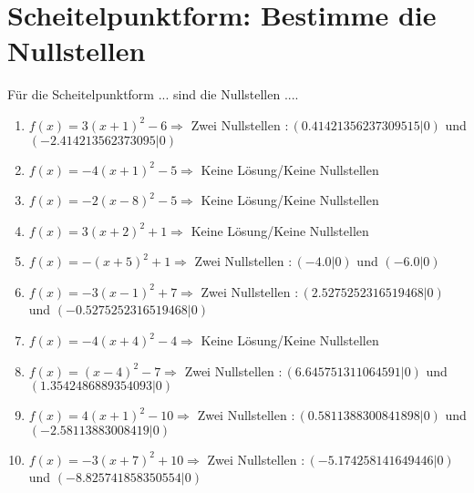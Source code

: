 \documentclass{article}%
\begin{document}
\section{Scheitelpunktform: Bestimme die Nullstellen}%
\label{sec:ScheitelpunktformBestimmedieNullstellen}%
Für die Scheitelpunktform ... sind die Nullstellen ....%
\begin{enumerate}[label=\alph*)]%
\item%
\newline\vspace{0.5cm}$f(x)=3(x+1)^2 -6 \Rightarrow $ Zwei Nullstellen $: (0.41421356237309515|0) $ und $ (-2.414213562373095|0) $%
\item%
\newline\vspace{0.5cm}$f(x)=-4(x+1)^2 -5 \Rightarrow  $ Keine Lösung/Keine Nullstellen $ $%
\item%
\newline\vspace{0.5cm}$f(x)=-2(x-8)^2 -5 \Rightarrow  $ Keine Lösung/Keine Nullstellen $ $%
\item%
\newline\vspace{0.5cm}$f(x)=3(x+2)^2 +1 \Rightarrow  $ Keine Lösung/Keine Nullstellen $ $%
\item%
\newline\vspace{0.5cm}$f(x)=-(x+5)^2 +1 \Rightarrow $ Zwei Nullstellen $: (-4.0|0) $ und $ (-6.0|0) $%
\item%
\newline\vspace{0.5cm}$f(x)=-3(x-1)^2 +7 \Rightarrow $ Zwei Nullstellen $: (2.5275252316519468|0) $ und $ (-0.5275252316519468|0) $%
\item%
\newline\vspace{0.5cm}$f(x)=-4(x+4)^2 -4 \Rightarrow  $ Keine Lösung/Keine Nullstellen $ $%
\item%
\newline\vspace{0.5cm}$f(x)=(x-4)^2 -7 \Rightarrow $ Zwei Nullstellen $: (6.645751311064591|0) $ und $ (1.3542486889354093|0) $%
\item%
\newline\vspace{0.5cm}$f(x)=4(x+1)^2 -10 \Rightarrow $ Zwei Nullstellen $: (0.5811388300841898|0) $ und $ (-2.58113883008419|0) $%
\item%
\newline\vspace{0.5cm}$f(x)=-3(x+7)^2 +10 \Rightarrow $ Zwei Nullstellen $: (-5.174258141649446|0) $ und $ (-8.825741858350554|0) $%

\end{enumerate}
\end{document}
